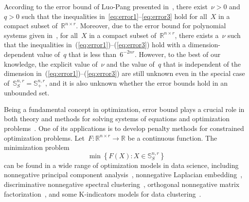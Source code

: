 \documentclass[11pt,a4paper]{article}  %
\theoremstyle{definition}
\newcommand{\RR}{\mathbb{R}}
\newcommand{\col}{r}
\newcommand{\stf}[1]{\mathbb{S}^{#1}}
\newcommand{\tsign}{{\scriptscriptstyle{S}}}
\begin{document}
According to the error bound of Luo-Pang presented in~\cite[Theorem~2.2]{Luo_Pang_1994},
there exist~$\nu>0$ and~$q>0$ such that the
inequalities
in~\mbox{\eqref{eq:error1}--\eqref{eq:error3}} hold for all~$X$ in a compact subset of~$\RR^{n\times \col}$.
Moreover, due to the error bound for polynomial systems  given
in~\cite[Corollary 3.8]{Li_Mordukhovich_Pham_2015},
for all~$X$ in a compact subset of~$\RR^{n\times \col}$, there exists a~$\nu$ such
that the inequalities in~(\ref{eq:error1})--(\ref{eq:error3}) hold with a
dimension-dependent value of~$q$ that is less than~$6^{-2nr}$.
However, to the best of our knowledge, the explicit value of~$\nu$ and the value of~$q$ that is
independent of the dimension in~(\ref{eq:error1})--(\ref{eq:error3}) are still unknown
even in the special case of~$\stf{n,\col}_\tsign\!\!= \stf{n,\col}_+$,
and it is also unknown whether the error bounds hold in an unbounded set.

Being a fundamental concept in optimization, error bound plays a crucial role in
both theory and methods for solving systems of equations and optimization problems~\cite{Luo_Pang_1994,Pang_1997}.
One of its applications is to develop penalty methods for constrained optimization problems.
Let~$F\mathrel{:} \RR^{n\times \col} \to \RR$ be a continuous function.
The minimization problem
\begin{equation}
    \label{eq:optnoc}
    \min \left\{F(X) \mathrel{:} X \in \stf{n,\col}_\tsign \right\}
\end{equation}
can be found in a wide range of optimization models in data science,
including  nonnegative principal component
analysis~\cite{Lui-Boumal,Zass_Shashua_2006},
nonnegative Laplacian embedding~\cite{Luo_Ding_Huang_Li_2009}, discriminative nonnegative spectral
clustering~\cite{Yang_etal_2012},
orthogonal nonnegative  matrix factorization~\cite{Pompili_Gillis_Absil_Glineu\col_2014,Yang_Oja_2010},
and some K-indicators models for data clustering~\cite{Chen_etal_2019,WCCP2021}.
\end{document}
